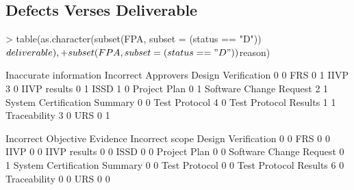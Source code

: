 \documentclass{article}
\begin{document}
\subsection{Defects Verses Deliverable}

\begin{Schunk}
\begin{Sinput}
> table(as.character(subset(FPA, subset = (status == "D"))$deliverable),
+       subset(FPA, subset = (status == "D"))$reason)
\end{Sinput}
\begin{Soutput}
                               Inaccurate information Incorrect Approvers
  Design Verification                               0                   0
  FRS                                               0                   1
  IIVP                                              3                   0
  IIVP results                                      0                   1
  ISSD                                              1                   0
  Project Plan                                      0                   1
  Software Change Request                           2                   1
  System Certification Summary                      0                   0
  Test Protocol                                     4                   0
  Test Protocol Results                             1                   1
  Traceability                                      3                   0
  URS                                               0                   1
                              
                               Incorrect Objective Evidence Incorrect scope
  Design Verification                                     0               0
  FRS                                                     0               0
  IIVP                                                    0               0
  IIVP results                                            0               0
  ISSD                                                    0               0
  Project Plan                                            0               0
  Software Change Request                                 0               1
  System Certification Summary                            0               0
  Test Protocol                                           0               0
  Test Protocol Results                                   6               0
  Traceability                                            0               0
  URS                                                     0               0
                              

\end{Soutput}
\end{Schunk}
\end{document}
